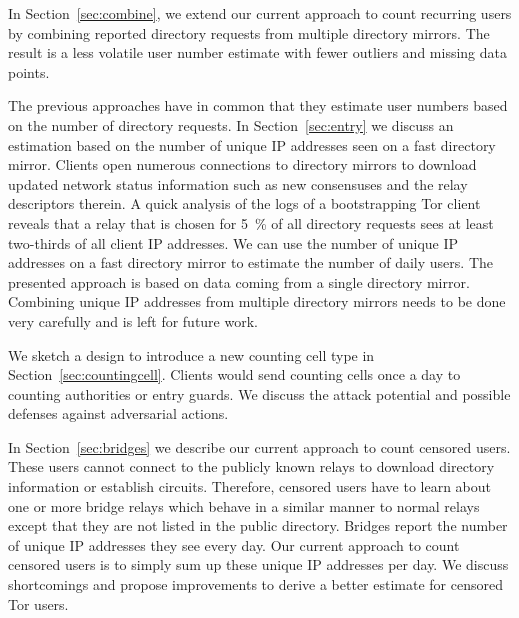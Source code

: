 \documentclass{article}
\begin{document}
In Section~\ref{sec:combine}, we extend our current approach to count
recurring users by combining reported directory requests from multiple
directory mirrors.
The result is a less volatile user number estimate with fewer outliers and
missing data points.

The previous approaches have in common that they estimate user numbers
based on the number of directory requests.
In Section~\ref{sec:entry} we discuss an estimation based on the number of
unique IP addresses seen on a fast directory mirror.
Clients open numerous connections to directory mirrors to download
updated network status information such as new consensuses and
the relay descriptors therein.
A quick analysis of the logs of a bootstrapping Tor client reveals that a
relay that is chosen for 5~\% of all directory requests sees at least
two-thirds of all client IP addresses.
%
We can use the number of
unique IP addresses on a fast directory mirror to estimate the number of
daily users.
The presented approach is based on data coming from a single directory
mirror.
Combining unique IP addresses from multiple directory mirrors needs to be
done very carefully and is left for future work.

We sketch a design to introduce a new counting cell type in
Section~\ref{sec:countingcell}.
Clients would send counting cells once a day to counting authorities or
entry guards.
We discuss the attack potential and possible defenses against adversarial actions.

In Section~\ref{sec:bridges} we describe our current approach to count
censored users.
These users cannot connect to the publicly known relays to download
directory information or establish circuits.
Therefore, censored users have to learn about one or more bridge relays
which behave in a similar manner to normal relays except that they are not listed in
the public directory.
Bridges report the number of unique IP addresses they see every day.
Our current approach to count censored users is to simply sum up these
unique IP addresses per day.
We discuss shortcomings and propose improvements to derive a better
estimate for censored Tor users.
\end{document}
